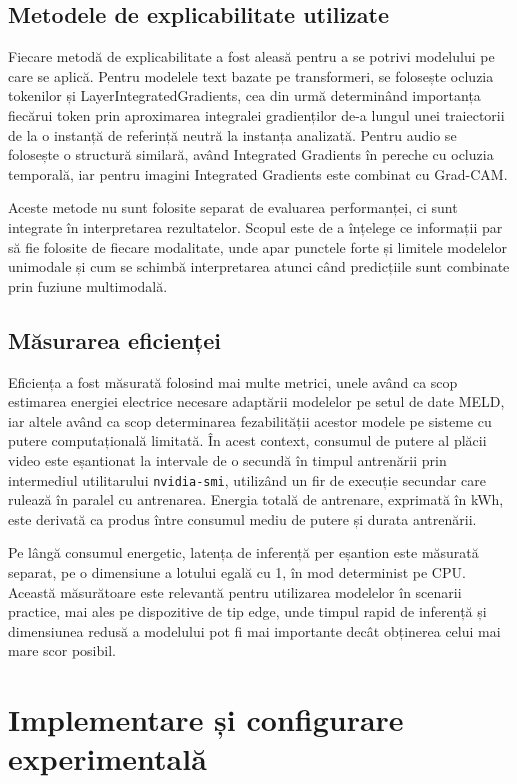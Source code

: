 \documentclass[12pt, a4paper]{article}
\begin{document}
\subsection{Metodele de explicabilitate utilizate}

Fiecare metodă de explicabilitate a fost aleasă pentru a se potrivi modelului pe care se aplică. Pentru modelele text bazate pe transformeri, se folosește ocluzia tokenilor și LayerIntegratedGradients, cea din urmă determinând importanța fiecărui token prin aproximarea integralei gradienților de-a lungul unei traiectorii de la o instanță de referință neutră la instanța analizată. Pentru audio se folosește o structură similară, având Integrated Gradients în pereche cu ocluzia temporală, iar pentru imagini Integrated Gradients este combinat cu Grad-CAM.

Aceste metode nu sunt folosite separat de evaluarea performanței, ci sunt integrate în interpretarea rezultatelor. Scopul este de a înțelege ce informații par să fie folosite de fiecare modalitate, unde apar punctele forte și limitele modelelor unimodale și cum se schimbă interpretarea atunci când predicțiile sunt combinate prin fuziune multimodală.

\subsection{Măsurarea eficienței}

Eficiența a fost măsurată folosind mai multe metrici, unele având ca scop estimarea energiei electrice necesare adaptării modelelor pe setul de date MELD, iar altele având ca scop determinarea fezabilității acestor modele pe sisteme cu putere computațională limitată. În acest context, consumul de putere al plăcii video este eșantionat la intervale de o secundă în timpul antrenării prin intermediul utilitarului \texttt{nvidia-smi}, utilizând un fir de execuție secundar care rulează în paralel cu antrenarea. Energia totală de antrenare, exprimată în kWh, este derivată ca produs între consumul mediu de putere și durata antrenării.

Pe lângă consumul energetic, latența de inferență per eșantion este măsurată separat, pe o dimensiune a lotului egală cu 1, în mod determinist pe CPU. Această măsurătoare este relevantă pentru utilizarea modelelor în scenarii practice, mai ales pe dispozitive de tip edge, unde timpul rapid de inferență și dimensiunea redusă a modelului pot fi mai importante decât obținerea celui mai mare scor posibil.
\newpage
\section{Implementare și configurare experimentală}
\end{document}
